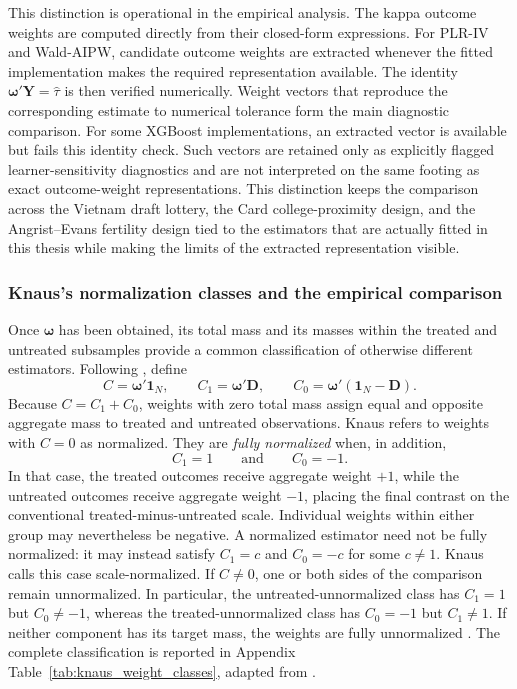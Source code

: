\documentclass[12pt, a4paper, oneside]{article}
\theoremstyle{plain}
\theoremstyle{definition}
\begin{document}
This distinction is operational in the empirical analysis. The kappa outcome
weights are computed directly from their closed-form expressions. For PLR-IV
and Wald-AIPW, candidate outcome weights are extracted whenever the fitted
implementation makes the required representation available. The identity
\(
    \boldsymbol{\omega}'\mathbf Y=\widehat{\tau}
\)
is then verified numerically. Weight vectors that reproduce the corresponding
estimate to numerical tolerance form the main diagnostic comparison. For some
XGBoost implementations, an extracted vector is available but fails this
identity check. Such vectors are retained only as explicitly flagged
learner-sensitivity diagnostics and are not interpreted on the same footing as
exact outcome-weight representations. This distinction keeps the comparison
across the Vietnam draft lottery, the Card college-proximity design, and the
Angrist--Evans fertility design tied to the estimators that are actually fitted
in this thesis while making the limits of the extracted representation visible.


\subsubsection{Knaus's normalization classes and the empirical comparison}

Once \(\boldsymbol{\omega}\) has been obtained, its total mass and its masses
within the treated and untreated subsamples provide a common classification of
otherwise different estimators. Following \citet[Table~4]{knaus2024treatment},
define
\begin{equation}
    C=\boldsymbol{\omega}'\mathbf 1_N,
    \qquad
    C_1=\boldsymbol{\omega}'\mathbf D,
    \qquad
    C_0=\boldsymbol{\omega}'(\mathbf 1_N-\mathbf D).
    \label{eq:knaus_weight_masses}
\end{equation}
Because \(C=C_1+C_0\), weights with zero total mass assign equal and opposite
aggregate mass to treated and untreated observations. Knaus refers to weights
with \(C=0\) as normalized. They are \emph{fully normalized} when, in addition,
\begin{equation}
    C_1=1
    \qquad\text{and}\qquad
    C_0=-1.
    \label{eq:knaus_full_normalization}
\end{equation}
In that case, the treated outcomes receive aggregate weight \(+1\), while
the untreated outcomes receive aggregate weight \(-1\), placing the final
contrast on the conventional treated-minus-untreated scale. Individual
weights within either group may nevertheless be negative.
A normalized estimator need not
be fully normalized: it may instead satisfy \(C_1=c\) and \(C_0=-c\) for some
\(c\neq1\). Knaus calls this case scale-normalized. If \(C\neq0\), one or both
sides of the comparison remain unnormalized. In particular, the
untreated-unnormalized class has \(C_1=1\) but \(C_0\neq-1\), whereas the
treated-unnormalized class has \(C_0=-1\) but \(C_1\neq1\). If neither component
has its target mass, the weights are fully unnormalized
\citep[Section~4.1]{knaus2024treatment}.
The complete classification is reported in Appendix
Table~\ref{tab:knaus_weight_classes}, adapted from
\citet[Table~4]{knaus2024treatment}.
\end{document}

